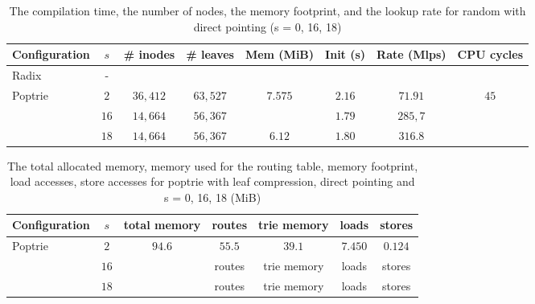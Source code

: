 \documentclass{article}
\begin{document}
\begin{table}
    \begin{center}
        \begin{tabular}{|l|c|c|c|c|c|c|c|}
            \hline
            Configuration   & $s$ & \# inodes & \# leaves & Mem (MiB) & Init (s) & Rate (Mlps) & CPU cycles \\ 
            \hline
            Radix           & -   & &  & & & & \\ 
            \hline
            Poptrie         & $2$ & $36,412$ & $63,527$ & $7.575$ & $2.16$ & $71.91$ & $45$ \\  
                            & $16$ & $14,664$ & $56,367$ &  & $1.79$ & $285,7$ & \\  
                            & $18$ & $14,664$ & $56,367$ & $6.12$ & $1.80$ & $316.8$ & \\  
            \hline
        \end{tabular}
    \end{center}
    \caption{The compilation time, the number of nodes, the memory footprint, and the lookup rate for
random with direct pointing (s = 0, 16, 18)}
\end{table}
\noindent
\begin{table}
    \begin{center}
        \begin{tabular}{|l|c|c|c|c|c|c|}
            \hline
            Configuration  & $s$ & total memory & routes & trie memory & loads & stores \\
            \hline
            Poptrie  & $2$ & $94.6$ & $55.5$ & $39.1$ & $7.450$ & $0.124$ \\
              & $16$ &  & routes & trie memory & loads & stores \\
              & $18$ &  & routes & trie memory & loads & stores \\
            \hline
        \end{tabular}
    \end{center}
    \caption{The total allocated memory, memory used for the routing table, memory footprint, load accesses, store accesses for poptrie with
 leaf compression, direct pointing and s = 0, 16, 18 (MiB)}
\end{table}
\end{document}

